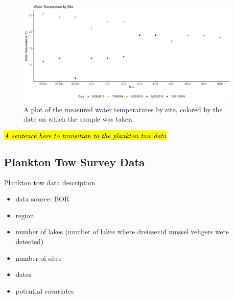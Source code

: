 \documentclass[12pt]{article}\usepackage[]{graphicx}\usepackage[]{color}
\makeatletter
\def\maxwidth{ %
  \ifdim\Gin@nat@width>\linewidth
    \linewidth
  \else
    \Gin@nat@width
  \fi
}
\newenvironment{knitrout}{}{} %
\def\maxwidth{ %
  \ifdim\Gin@nat@width>\linewidth
    \linewidth
  \else
    \Gin@nat@width
  \fi
}
\newenvironment{knitrout}{}{} %
\makeatother
\begin{document}
\begin{figure}[]
\begin{knitrout}
\color{fgcolor}

{\centering \includegraphics[width=\maxwidth]{figure/eDNA_visualization_temp-1} 

}



\end{knitrout}
\caption{A plot of the measured water temperatures by site, colored by the date on which the sample was taken.}
\label{fig:eDNA_temp}
\end{figure}

\hl{\textit{A sentence here to transition to the plankton tow data}}

\subsection{Plankton Tow Survey Data}




Plankton tow data description
\begin{itemize}
  \item data source: BOR
  \item region
  \item number of lakes (number of lakes where dreissenid mussel veligers were detected)
  \item number of sites
  \item dates
  \item potential covariates
\end{itemize}
\end{document}
